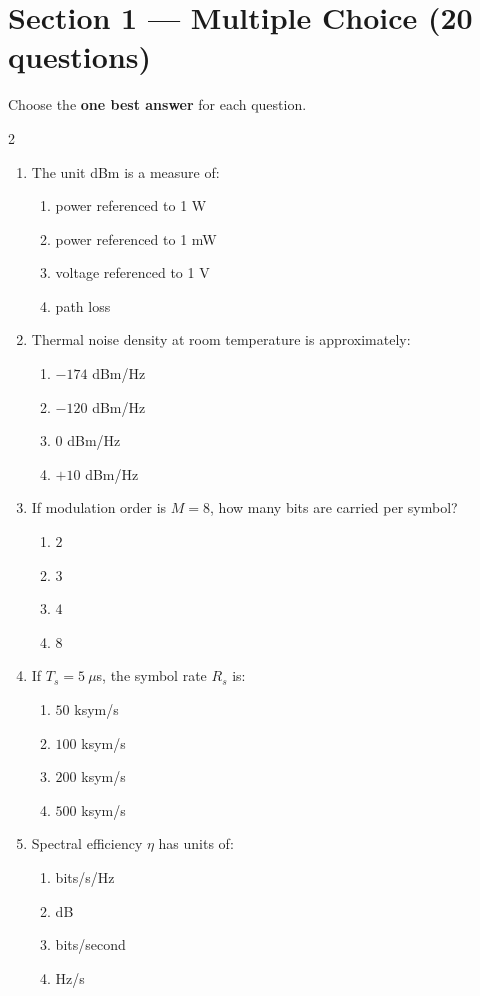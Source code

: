 \section*{Section 1 --- Multiple Choice (20 questions)}
Choose the \textbf{one best answer} for each question.

\vspace{0.3cm}
\begin{multicols}{2}
\begin{enumerate}[leftmargin=*, itemsep=0.4em]
\item The unit dBm is a measure of:
\begin{enumerate}[label=\alph*)]
\item power referenced to 1 W
\item power referenced to 1 mW
\item voltage referenced to 1 V
\item path loss
\end{enumerate}

\item Thermal noise density at room temperature is approximately:
\begin{enumerate}[label=\alph*)]
\item $-174$ dBm/Hz
\item $-120$ dBm/Hz
\item $0$ dBm/Hz
\item $+10$ dBm/Hz
\end{enumerate}

\item If modulation order is $M=8$, how many bits are carried per symbol?
\begin{enumerate}[label=\alph*)]
\item $2$
\item $3$
\item $4$
\item $8$
\end{enumerate}

\item If $T_s = 5\ \mu$s, the symbol rate $R_s$ is:
\begin{enumerate}[label=\alph*)]
\item $50$ ksym/s
\item $100$ ksym/s
\item $200$ ksym/s
\item $500$ ksym/s
\end{enumerate}

\item Spectral efficiency $\eta$ has units of:
\begin{enumerate}[label=\alph*)]
\item bits/s/Hz
\item dB
\item bits/second
\item Hz/s
\end{enumerate}


\end{enumerate}
\end{multicols}
